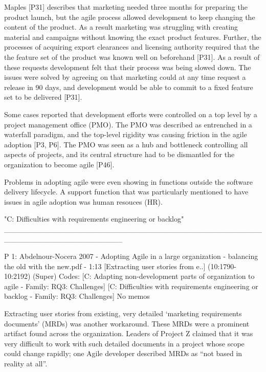 \documentclass[preprint,authoryear,12pt]{elsarticle}
\begin{document}
Maples [P31] describes that marketing needed three months for preparing the
product launch, but the agile process allowed development to keep changing the
content of the product. As a result marketing was struggling with creating
material and campaigns without knowing the exact product features. Further, the
processes of acquiring export clearances and licensing authority required that
the the feature set of the product was known well on beforehand [P31].
As a result of these requests development felt that their process was being
slowed down. The issues were solved by agreeing on that marketing could at any
time request a release in 90 days, and development would be able to commit to a
fixed feature set to be delivered [P31].



Some cases reported that development efforts were controlled on a top level by a
project management office (PMO). The PMO was described as entrenched in a
waterfall paradigm, and the top-level rigidity was causing friction in the
agile adoption [P3, P6]. The PMO was seen as a hub and bottleneck controlling
all aspects of projects, and its central structure had to be dismantled for
the organization to become agile [P46].

Problems in adopting agile were even showing in functions outside the software
delivery lifecycle. A support function that was particularly mentioned to
have issues in agile adoption was human resouces (HR).






"C: Difficulties with requirements engineering or backlog"
______________________________________________________________________

P 1: Abdelnour-Nocera 2007 - Adopting Agile in a large organization - balancing the old with the new.pdf - 1:13 [Extracting user stories from e..]  (10:1790-10:2192)   (Super)
Codes:	[C: Adapting non-development parts of organization to agile - Family: RQ3: Challenges] [C: Difficulties with requirements engineering or backlog - Family: RQ3: Challenges] 
No memos

Extracting user stories from existing, very detailed ‘marketing requirements 
documents’ (MRDs) was another workaround. These MRDs were a prominent artifact 
found across the organization. Leaders of Project Z claimed that it was very difficult 
to work with such detailed documents in a project whose scope could change rapidly; 
one Agile developer described MRDs as “not based in reality at all”.
\end{document}
